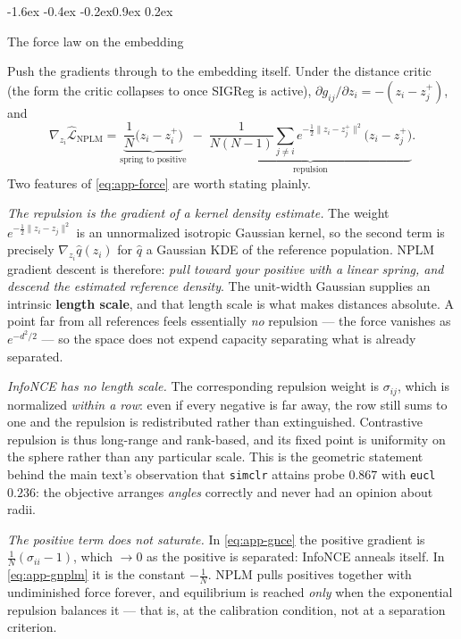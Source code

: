 \documentclass{article}
\makeatletter
\renewcommand\subsection{\@startsection{subsection}{2}{\z@}%
  {-1.6ex \@plus -0.4ex \@minus -0.2ex}{0.9ex \@plus 0.2ex}%
  {\normalsize\bf\raggedright}}
\makeatother
\begin{document}
\subsection{The force law on the embedding}
\label{app:forces}

Push the gradients through to the embedding itself. Under the distance critic
(the form the critic collapses to once SIGReg is active), $\partial g_{ij}/
\partial z_i = -(z_i - z_j^+)$, and
\begin{equation}
\nabla_{z_i}\widehat{\mathcal{L}}_{\mathrm{NPLM}}
= \underbrace{\frac1N\big(z_i - z_i^{+}\big)}_{\text{spring to positive}}
\;-\;
\underbrace{\frac{1}{N(N-1)}\sum_{j\neq i}
e^{-\frac12\|z_i-z_j^{+}\|^{2}}\big(z_i - z_j^{+}\big)}_{\text{repulsion}} .
\label{eq:app-force}
\end{equation}
Two features of \eqref{eq:app-force} are worth stating plainly.

\emph{The repulsion is the gradient of a kernel density estimate.} The weight
$e^{-\frac12\|z_i-z_j\|^2}$ is an unnormalized isotropic Gaussian kernel, so
the second term is precisely $\nabla_{z_i}\hat q(z_i)$ for
$\hat q$ a Gaussian KDE of the reference population. NPLM gradient descent is
therefore: \emph{pull toward your positive with a linear spring, and descend the
estimated reference density}. The unit-width Gaussian supplies an intrinsic
\textbf{length scale}, and that length scale is what makes distances absolute.
A point far from all references feels essentially \emph{no} repulsion --- the
force vanishes as $e^{-d^2/2}$ --- so the space does not expend capacity
separating what is already separated.

\emph{InfoNCE has no length scale.} The corresponding repulsion weight is
$\sigma_{ij}$, which is normalized \emph{within a row}: even if every negative
is far away, the row still sums to one and the repulsion is redistributed
rather than extinguished. Contrastive repulsion is thus long-range and
rank-based, and its fixed point is uniformity on the sphere rather than any
particular scale. This is the geometric statement behind the main text's
observation that \texttt{simclr} attains probe $0.867$ with \texttt{eucl}
$0.236$: the objective arranges \emph{angles} correctly and never had an
opinion about radii.

\emph{The positive term does not saturate.} In \eqref{eq:app-gnce} the positive
gradient is $\tfrac1N(\sigma_{ii}-1)$, which $\to 0$ as the positive is
separated: InfoNCE anneals itself. In \eqref{eq:app-gnplm} it is the constant
$-\tfrac1N$. NPLM pulls positives together with undiminished force forever, and
equilibrium is reached \emph{only} when the exponential repulsion balances it
--- that is, at the calibration condition, not at a separation criterion.
\end{document}
